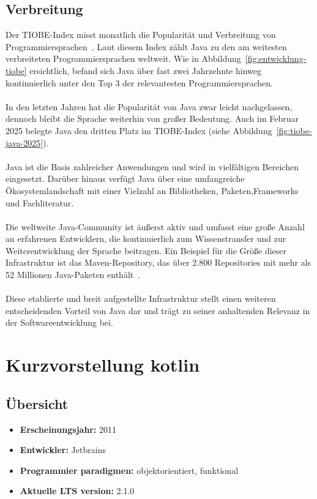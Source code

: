 \documentclass[11pt]{article}
\begin{document}
    \subsection{Verbreitung}
    Der TIOBE-Index misst monatlich die Popularität und Verbreitung von Programmiersprachen~\cite{tiobe}.
    Laut diesem Index zählt Java zu den am weitesten verbreiteten Programmiersprachen weltweit.
    Wie in Abbildung~\ref{fig:entwicklung-tiobe} ersichtlich, befand sich Java über fast zwei Jahrzehnte hinweg
    kontinuierlich unter den Top 3 der relevantesten Programmiersprachen.\\
    \\
    In den letzten Jahren hat die Popularität von Java zwar leicht nachgelassen, dennoch bleibt die Sprache weiterhin
    von großer Bedeutung.
    Auch im Februar 2025 belegte Java den dritten Platz im TIOBE-Index (siehe Abbildung~\ref{fig:tiobe-java-2025}).\\
    \\
    Java ist die Basis zahlreicher Anwendungen und wird in vielfältigen Bereichen eingesetzt.
    Darüber hinaus verfügt Java über eine umfangreiche Ökosystemlandschaft mit einer Vielzahl an Bibliotheken, Paketen,Frameworks und Fachliteratur.\\
    \\
    Die weltweite Java-Community ist äußerst aktiv und umfasst eine große Anzahl an erfahrenen Entwicklern, die kontinuierlich zum Wissenstransfer und zur Weiterentwicklung der Sprache beitragen.
    Ein Beispiel für die Größe dieser Infrastruktur ist das Maven-Repository, das über 2.800 Repositories mit mehr als 52 Millionen Java-Paketen enthält~\cite{maven}.\\
    \\
    Diese etablierte und breit aufgestellte Infrastruktur stellt einen weiteren entscheidenden Vorteil von Java dar und
    trägt zu seiner anhaltenden Relevanz in der Softwareentwicklung bei.\\

    \section{Kurzvorstellung kotlin}

    \subsection{Übersicht}
    \begin{itemize}
        \item \textbf{Erscheinungsjahr:} 2011
        \item \textbf{Entwickler:} Jetbrains
        \item \textbf{Programmier paradigmen:} objektorientiert, funktional
        \item \textbf{Aktuelle LTS version:} 2.1.0
    \end{itemize}
\end{document}
